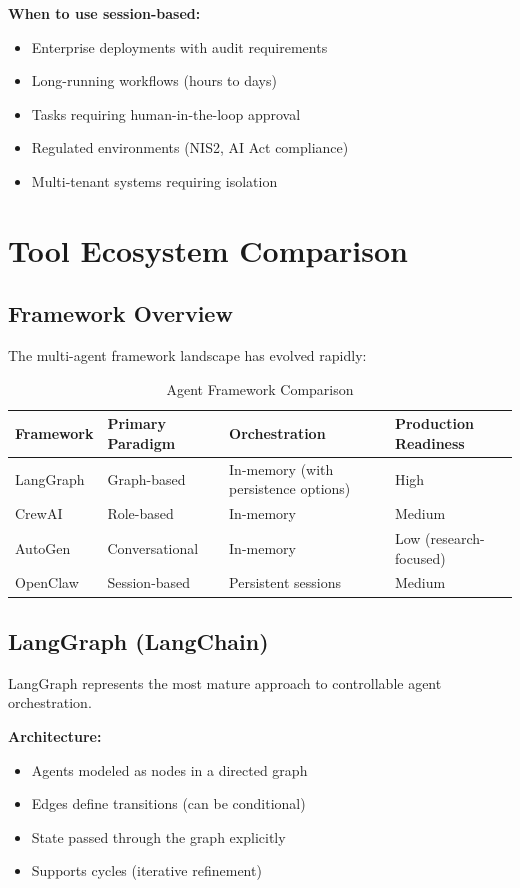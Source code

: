 \textbf{When to use session-based:}
\begin{itemize}
    \item Enterprise deployments with audit requirements
    \item Long-running workflows (hours to days)
    \item Tasks requiring human-in-the-loop approval
    \item Regulated environments (NIS2, AI Act compliance)
    \item Multi-tenant systems requiring isolation
\end{itemize}

\section{Tool Ecosystem Comparison}
\label{sec:tool-ecosystem}

\subsection{Framework Overview}
\label{subsec:framework-overview}

The multi-agent framework landscape has evolved rapidly:

\begin{table}[htbp]
\centering
\caption{Agent Framework Comparison}
\label{tab:framework-comparison}
\begin{tabular}{llll}
\toprule
\textbf{Framework} & \textbf{Primary Paradigm} & \textbf{Orchestration} & \textbf{Production Readiness} \\
\midrule
LangGraph & Graph-based & In-memory (with persistence options) & High \\
CrewAI & Role-based & In-memory & Medium \\
AutoGen & Conversational & In-memory & Low (research-focused) \\
OpenClaw & Session-based & Persistent sessions & Medium \\
\bottomrule
\end{tabular}
\end{table}

\subsection{LangGraph (LangChain)}
\label{subsec:langgraph}

LangGraph represents the most mature approach to controllable agent orchestration.

\textbf{Architecture:}
\begin{itemize}
    \item Agents modeled as nodes in a directed graph
    \item Edges define transitions (can be conditional)
    \item State passed through the graph explicitly
    \item Supports cycles (iterative refinement)
\end{itemize}

